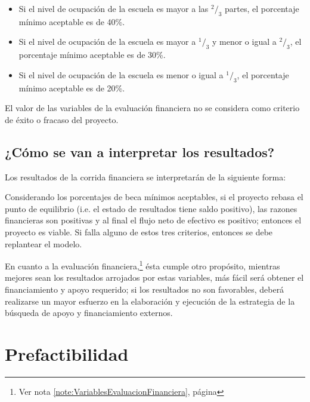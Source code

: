 \begin{itemize}
	\item Si el nivel de ocupación de la escuela es mayor a las $^2/_3$ partes, el porcentaje mínimo aceptable es de 40\%.
	\item Si el nivel de ocupación de la escuela es mayor a $^1/_3$ y menor o igual a $^2/_3$, el porcentaje mínimo aceptable es de 30\%.
	\item Si el nivel de ocupación de la escuela es menor o igual a $^1/_3$, el porcentaje mínimo aceptable es de 20\%.
\end{itemize}

El valor de las variables de la evaluación financiera no se considera como criterio de éxito o fracaso del proyecto.


\subsection{¿Cómo se van a interpretar los resultados?}

Los resultados de la corrida financiera se interpretarán de la siguiente forma:

Considerando los porcentajes de beca mínimos aceptables, si el proyecto rebasa el punto de equilibrio (i.e. el estado de resultados tiene saldo positivo), las razones financieras son positivas y al final el flujo neto de efectivo es positivo; entonces el proyecto es viable. Si falla alguno de estos tres criterios, entonces se debe replantear el modelo.

En cuanto a la evaluación financiera,\footnote{Ver nota \ref{note:VariablesEvaluacionFinanciera}, página \pageref{note:VariablesEvaluacionFinanciera}} ésta cumple otro propósito, mientras mejores sean los resultados arrojados por estas variables, más fácil será obtener el financiamiento y apoyo requerido; si los resultados no son favorables, deberá realizarse un mayor esfuerzo en la elaboración y ejecución de la estrategia de la búsqueda de apoyo y financiamiento externos.

\section{Prefactibilidad}

